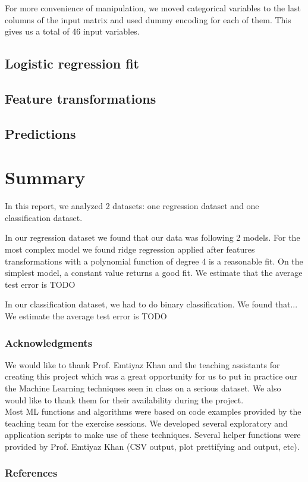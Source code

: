 \documentclass{article} %
\begin{document}
  For more convenience of manipulation, we moved categorical variables to the last columns of the input matrix and used dummy encoding for each of them. This gives us a total of 46 input variables.

  \subsection{Logistic regression fit}

  \subsection{Feature transformations}

  \subsection{Predictions}


\section{Summary}
In this report, we analyzed 2 datasets: one regression dataset and one classification dataset. 

In our regression dataset we found that our data was following 2 models. For the most complex model we found ridge regression applied after features transformations with a polynomial function of degree 4 is a reasonable fit. On the simplest model, a constant value returns a good fit. We estimate that the average test error is TODO

In our classification dataset, we had to do binary classification. We found that... We estimate the average test error is TODO

\subsubsection*{Acknowledgments}
  We would like to thank Prof. Emtiyaz Khan and the teaching assistants for creating this project which was a great opportunity for us to put in practice our the Machine Learning techniques seen in class on a serious dataset. We also would like to thank them for their availability during the project.\\
  Most ML functions and algorithms were based on code examples provided by the teaching team for the exercise sessions. We developed several exploratory and application scripts to make use of these techniques. Several helper functions were provided by Prof. Emtiyaz Khan (CSV output, plot prettifying and output, etc).
  
\subsubsection*{References}
\end{document}
